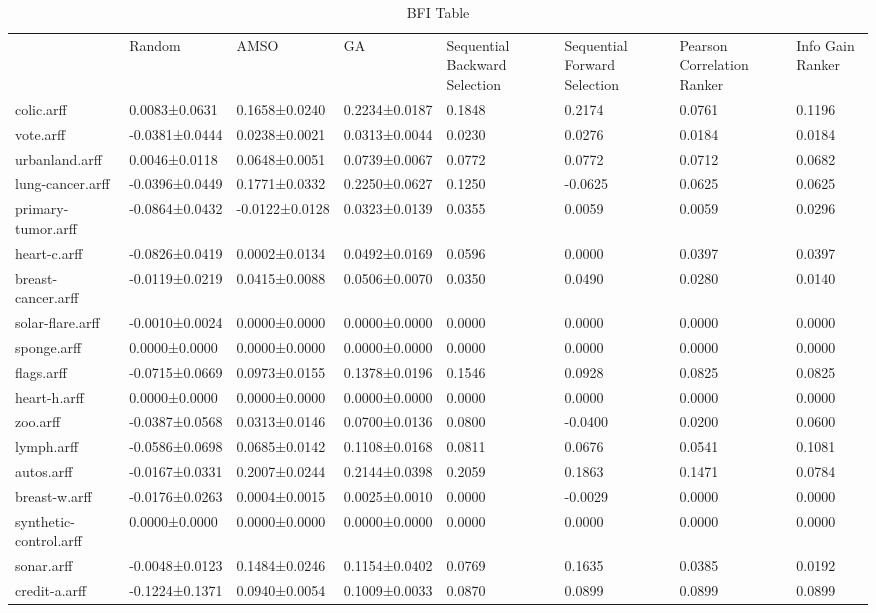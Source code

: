 \begin{table*}[h]
\caption{BFI Table}
\label{tbl:bfi}\begin{tabular}{llllllll}
\noalign{\smallskip}\hline\noalign{\smallskip}
&Random&AMSO&GA&Sequential Backward Selection&Sequential Forward Selection&Pearson Correlation Ranker&Info Gain Ranker\\\noalign{\smallskip}\hline
colic.arff&0.0083±0.0631&0.1658±0.0240&0.2234±0.0187&0.1848&0.2174&0.0761&0.1196\\
vote.arff&-0.0381±0.0444&0.0238±0.0021&0.0313±0.0044&0.0230&0.0276&0.0184&0.0184\\
urbanland.arff&0.0046±0.0118&0.0648±0.0051&0.0739±0.0067&0.0772&0.0772&0.0712&0.0682\\
lung-cancer.arff&-0.0396±0.0449&0.1771±0.0332&0.2250±0.0627&0.1250&-0.0625&0.0625&0.0625\\
primary-tumor.arff&-0.0864±0.0432&-0.0122±0.0128&0.0323±0.0139&0.0355&0.0059&0.0059&0.0296\\
heart-c.arff&-0.0826±0.0419&0.0002±0.0134&0.0492±0.0169&0.0596&0.0000&0.0397&0.0397\\
breast-cancer.arff&-0.0119±0.0219&0.0415±0.0088&0.0506±0.0070&0.0350&0.0490&0.0280&0.0140\\
solar-flare.arff&-0.0010±0.0024&0.0000±0.0000&0.0000±0.0000&0.0000&0.0000&0.0000&0.0000\\
sponge.arff&0.0000±0.0000&0.0000±0.0000&0.0000±0.0000&0.0000&0.0000&0.0000&0.0000\\
flags.arff&-0.0715±0.0669&0.0973±0.0155&0.1378±0.0196&0.1546&0.0928&0.0825&0.0825\\
heart-h.arff&0.0000±0.0000&0.0000±0.0000&0.0000±0.0000&0.0000&0.0000&0.0000&0.0000\\
zoo.arff&-0.0387±0.0568&0.0313±0.0146&0.0700±0.0136&0.0800&-0.0400&0.0200&0.0600\\
lymph.arff&-0.0586±0.0698&0.0685±0.0142&0.1108±0.0168&0.0811&0.0676&0.0541&0.1081\\
autos.arff&-0.0167±0.0331&0.2007±0.0244&0.2144±0.0398&0.2059&0.1863&0.1471&0.0784\\
breast-w.arff&-0.0176±0.0263&0.0004±0.0015&0.0025±0.0010&0.0000&-0.0029&0.0000&0.0000\\
synthetic-control.arff&0.0000±0.0000&0.0000±0.0000&0.0000±0.0000&0.0000&0.0000&0.0000&0.0000\\
sonar.arff&-0.0048±0.0123&0.1484±0.0246&0.1154±0.0402&0.0769&0.1635&0.0385&0.0192\\
credit-a.arff&-0.1224±0.1371&0.0940±0.0054&0.1009±0.0033&0.0870&0.0899&0.0899&0.0899\\

\end{tabular}
\end{table*}

